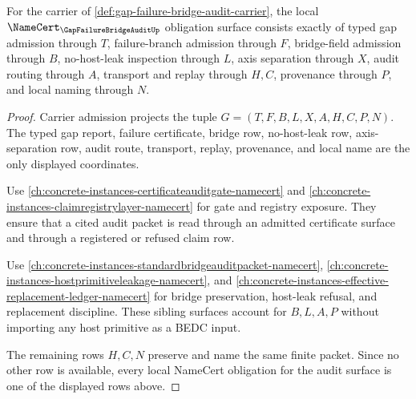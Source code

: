 \begin{theorem}
\label{thm:gap-failure-bridge-audit-namecert-obligations}
For the carrier of \autoref{def:gap-failure-bridge-audit-carrier}, the local $\NameCert_{\GapFailureBridgeAuditUp}$ obligation surface consists exactly of typed gap admission through $T$, failure-branch admission through $F$, bridge-field admission through $B$, no-host-leak inspection through $L$, axis separation through $X$, audit routing through $A$, transport and replay through $H,C$, provenance through $P$, and local naming through $N$.
\end{theorem}
\begin{proof}
Carrier admission projects the tuple $G=(T,F,B,L,X,A,H,C,P,N)$. The typed gap report, failure certificate, bridge row, no-host-leak row, axis-separation row, audit route, transport, replay, provenance, and local name are the only displayed coordinates.

Use \autoref{ch:concrete-instances-certificateauditgate-namecert} and \autoref{ch:concrete-instances-claimregistrylayer-namecert} for gate and registry exposure. They ensure that a cited audit packet is read through an admitted certificate surface and through a registered or refused claim row.

Use \autoref{ch:concrete-instances-standardbridgeauditpacket-namecert}, \autoref{ch:concrete-instances-hostprimitiveleakage-namecert}, and \autoref{ch:concrete-instances-effective-replacement-ledger-namecert} for bridge preservation, host-leak refusal, and replacement discipline. These sibling surfaces account for $B,L,A,P$ without importing any host primitive as a BEDC input.

The remaining rows $H,C,N$ preserve and name the same finite packet. Since no other row is available, every local NameCert obligation for the audit surface is one of the displayed rows above.
\end{proof}

